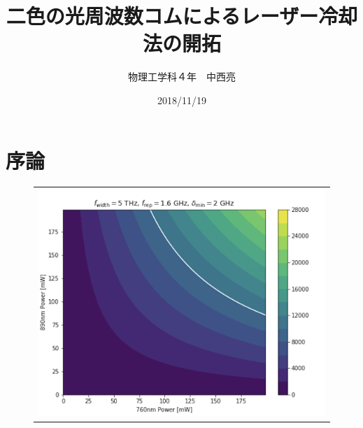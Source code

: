 \documentclass[uplatex, dvipdfmx, a4paper, report, papersize, 11pt]{jsbook}
\title{二色の光周波数コムによるレーザー冷却法の開拓}
\author{物理工学科４年　中西亮}
\date{2018/11/19}
\begin{document}
\maketitle
\newpage

\setcounter{tocdepth}{2}
\tableofcontents


\newpage
\chapter{序論}
\newpage
\begin{figure}[t]
  \centering
    \begin{tabular}{c}
      \begin{minipage}{1\hsize}
        \centering
          \includegraphics[keepaspectratio,  scale=0.5,  angle=0]
                          {figures/chapter3/5THz-1.6GHz-2GHz_200mW-copy.png}
                          \caption{}
                          \label{5THz-1.6GHz-2GHz_1W}
      \end{minipage}
    \end{tabular}
\end{figure}
\end{document}
